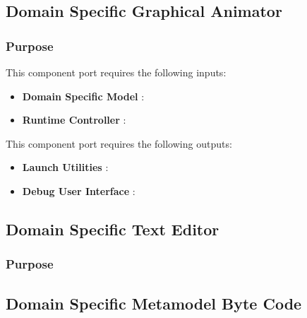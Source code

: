 \documentclass{gemoc} %
\begin{document}
\subsection{Domain Specific Graphical Animator}


\subsubsection{Purpose}

This component port requires the following inputs:
\begin{itemize}
  \item \textbf{Domain Specific Model} :
  \item \textbf{Runtime Controller} :
\end{itemize}

This component port requires the following outputs:
\begin{itemize}
  \item \textbf{Launch Utilities} :
  \item \textbf{Debug User Interface} :
\end{itemize}

\subsection{Domain Specific Text Editor}


\subsubsection{Purpose}



\subsection{Domain Specific Metamodel Byte Code}
\end{document}

